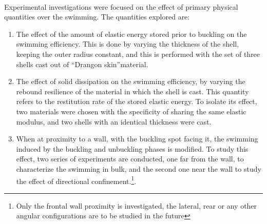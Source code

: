 \paragraph{}
Experimental investigations were focused on the effect of primary physical quantities over the swimming. The quantities explored are:
\begin{enumerate}
	\item The effect of the amount of elastic energy stored prior to buckling on the swimming efficiency. This is done by varying the thickness of the shell, keeping the outer radius constant, and this is performed with the set of three shells cast out of "`Drangon skin"'\textregistered material.
	\item The effect of solid dissipation on the swimming efficiency, by varying the rebound resilience of the material in which the shell is cast. This quantity refers to the restitution rate of the stored elastic energy. To isolate its effect, two materials were chosen with the specificity of sharing the same elastic modulus, and two shells with an identical thickness were cast.
	\item When at proximity to a wall, with the buckling spot facing it, the swimming induced by the buckling and unbuckling phases is modified. To study this effect, two series of experiments are conducted, one far from the wall, to characterize the swimming in bulk, and the second one near the wall to study the effect of directional confinement.\footnote{Only the frontal wall proximity is investigated, the lateral, rear or any other angular configurations are to be studied in the future}. 
\end{enumerate}
